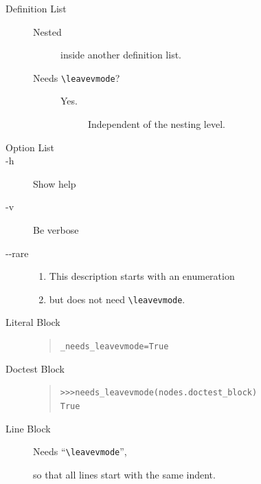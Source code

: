 \documentclass[a4paper]{article}
\newenvironment{DUlineblock}[1]{%
    \list{}{\setlength{\partopsep}{\parskip}
            \addtolength{\partopsep}{\baselineskip}
            \setlength{\topsep}{0pt}
            \setlength{\itemsep}{0.15\baselineskip}
            \setlength{\parsep}{0pt}
            \setlength{\leftmargin}{#1}}
    \raggedright
  }
  {\endlist}
\providecommand*{\DUoptionlistlabel}[1]{\bfseries #1 \hfill}
\newenvironment{DUoptionlist}{%
    \list{}{\setlength{\labelwidth}{\DUoptionlistindent}
            \setlength{\rightmargin}{1cm}
            \setlength{\leftmargin}{\rightmargin}
            \addtolength{\leftmargin}{\labelwidth}
            \addtolength{\leftmargin}{\labelsep}
            \renewcommand{\makelabel}{\DUoptionlistlabel}}
  }
  {\endlist}
\begin{document}
\begin{description}
\item[{Definition List}] \leavevmode
\begin{description}
\item[{Nested}] 
inside another definition list.

\item[{Needs \texttt{\textbackslash{}leavevmode}?}] \leavevmode
\begin{description}
\item[{Yes.}] 
Independent of the nesting level.
\end{description}
\end{description}

\item[{Option List}] \leavevmode
\begin{DUoptionlist}
\item[-h]  Show help
\item[-v]  Be verbose
\item[-{}-rare]  
\begin{enumerate}
\renewcommand{\labelenumi}{\alph{enumi})}
\item This description starts with an enumeration

\item but does not need \texttt{\textbackslash{}leavevmode}.
\end{enumerate}
\end{DUoptionlist}

\item[{Literal Block}] \leavevmode
\begin{quote}
\begin{alltt}
_needs_leavevmode  = True
\end{alltt}
\end{quote}

\item[{Doctest Block}] \leavevmode
\begin{quote}
\begin{alltt}
>>> needs_leavevmode(nodes.doctest_block)
True
\end{alltt}
\end{quote}

\item[{Line Block}] \leavevmode
\begin{DUlineblock}{0em}
\item[] Needs “\texttt{\textbackslash{}leavevmode}”,
\item[] so that all lines start with the same indent.
\end{DUlineblock}


\end{description}
\end{document}
